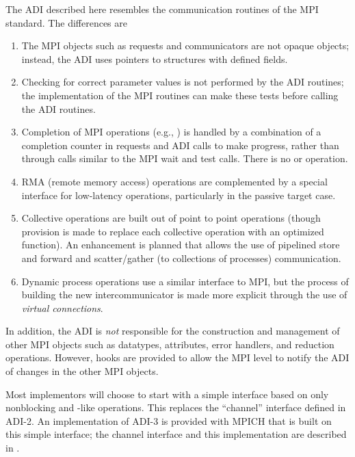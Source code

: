 The ADI described here resembles the communication routines of the MPI
standard.  The differences are
\begin{enumerate}
\item The MPI objects such as requests and communicators are not
opaque objects; instead, the ADI uses pointers to structures with
defined fields.

\item Checking for correct parameter values is not performed by the
ADI routines; the implementation of the MPI routines can make these
tests before calling the ADI routines.

\item Completion of MPI operations (e.g., ) is handled
by a combination of a completion counter in requests and ADI calls to make
progress, rather than through calls similar to the MPI wait and test
calls.  There is no  or  operation.

\item RMA (remote memory access) operations are complemented by a
special interface for low-latency operations, particularly in the
passive target case.

\item Collective operations are built out of point to point operations
(though provision is made to replace each collective operation with an
optimized function).  An enhancement is planned that allows the use of
pipelined store and forward and scatter/gather (to collections of processes)
communication.  

\item Dynamic process operations use a similar interface to MPI, but the
process of building the new intercommunicator is made more explicit
through the use of \emph{virtual connections}.
\end{enumerate}

In addition, the ADI is \emph{not} responsible for the construction
and management of other MPI objects such as datatypes, attributes,
error handlers, and reduction operations.  However, hooks are provided to
allow the MPI level to notify the ADI of changes in the other MPI objects.

Most implementors will choose to start with a simple interface based
on only nonblocking  and 
-like operations.  This replaces
the ``channel'' interface defined in ADI-2.  An implementation of
ADI-3 is provided with MPICH that is built on this simple
interface; the channel interface and this implementation are described
in \cite{channel3-tcp}.

